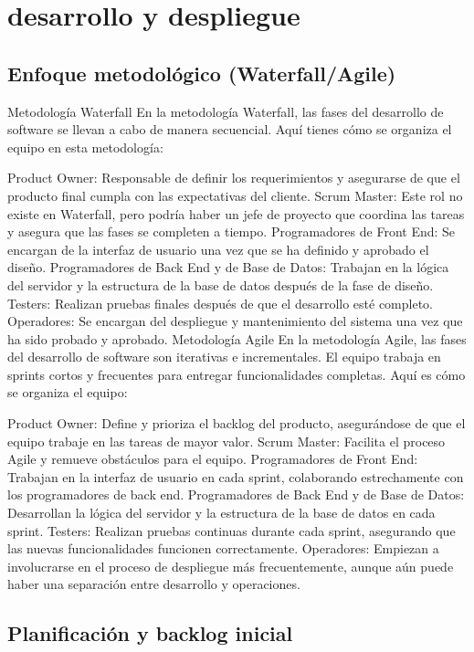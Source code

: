 \chapter{desarrollo y despliegue}
\section{Enfoque metodológico (Waterfall/Agile)}

Metodología Waterfall
En la metodología Waterfall, las fases del desarrollo de software se llevan a cabo de manera secuencial. Aquí tienes cómo se organiza el equipo en esta metodología:

Product Owner: Responsable de definir los requerimientos y asegurarse de que el producto final cumpla con las expectativas del cliente.
Scrum Master: Este rol no existe en Waterfall, pero podría haber un jefe de proyecto que coordina las tareas y asegura que las fases se completen a tiempo.
Programadores de Front End: Se encargan de la interfaz de usuario una vez que se ha definido y aprobado el diseño.
Programadores de Back End y de Base de Datos: Trabajan en la lógica del servidor y la estructura de la base de datos después de la fase de diseño.
Testers: Realizan pruebas finales después de que el desarrollo esté completo.
Operadores: Se encargan del despliegue y mantenimiento del sistema una vez que ha sido probado y aprobado.
Metodología Agile
En la metodología Agile, las fases del desarrollo de software son iterativas e incrementales. El equipo trabaja en sprints cortos y frecuentes para entregar funcionalidades completas. Aquí es cómo se organiza el equipo:

Product Owner: Define y prioriza el backlog del producto, asegurándose de que el equipo trabaje en las tareas de mayor valor.
Scrum Master: Facilita el proceso Agile y remueve obstáculos para el equipo.
Programadores de Front End: Trabajan en la interfaz de usuario en cada sprint, colaborando estrechamente con los programadores de back end.
Programadores de Back End y de Base de Datos: Desarrollan la lógica del servidor y la estructura de la base de datos en cada sprint.
Testers: Realizan pruebas continuas durante cada sprint, asegurando que las nuevas funcionalidades funcionen correctamente.
Operadores: Empiezan a involucrarse en el proceso de despliegue más frecuentemente, aunque aún puede haber una separación entre desarrollo y operaciones.

\section{Planificación y backlog inicial}

